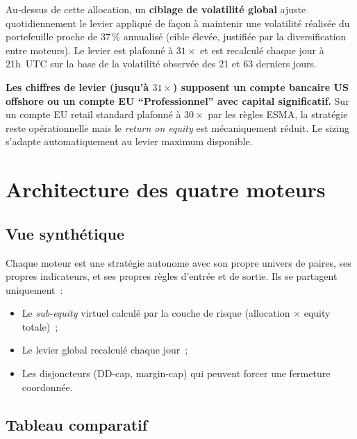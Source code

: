 \documentclass[11pt, a4paper]{scrartcl}
\begin{document}
Au-dessus de cette allocation, un \textbf{ciblage de volatilité global} ajuste quotidiennement le levier appliqué de façon à maintenir une volatilité réalisée du portefeuille proche de $37\,\%$ annualisé (cible élevée, justifiée par la diversification entre moteurs). Le levier est plafonné à $31\times$ et est recalculé chaque jour à 21h~UTC sur la base de la volatilité observée des 21 et 63 derniers jours.

\begin{warningbox}
\textbf{Les chiffres de levier (jusqu'à $31\times$) supposent un compte bancaire
US offshore ou un compte EU \enquote{Professionnel} avec capital significatif.}
Sur un compte EU retail standard plafonné à $30\times$ par les règles ESMA, la
stratégie reste opérationnelle mais le \emph{return on equity} est mécaniquement
réduit. Le sizing s'adapte automatiquement au levier maximum disponible.
\end{warningbox}


\section{Architecture des quatre moteurs}
\label{sec:architecture}

\subsection{Vue synthétique}

Chaque moteur est une stratégie autonome avec son propre univers de paires, ses propres indicateurs, et ses propres règles d'entrée et de sortie. Ils se partagent uniquement~:

\begin{itemize}
\item Le \emph{sub-equity} virtuel calculé par la couche de risque (allocation $\times$ equity totale)~;
\item Le levier global recalculé chaque jour~;
\item Les disjoncteurs (DD-cap, margin-cap) qui peuvent forcer une fermeture coordonnée.
\end{itemize}

\subsection{Tableau comparatif}
\end{document}
